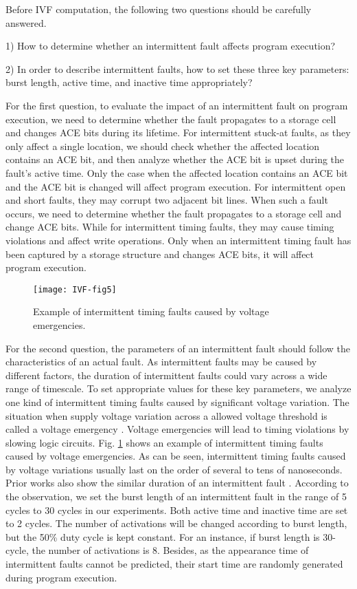 Before IVF computation, the following two questions should be carefully answered.

1) How to determine whether an intermittent fault affects program execution?

2) In order to describe intermittent faults, how to set these three key parameters: burst length, active time, and inactive time appropriately?

For the first question, to evaluate the impact of an intermittent fault on program execution, we need to determine whether the fault propagates to a storage cell and changes ACE bits during its lifetime. For intermittent stuck-at faults, as they only affect a single location, we should check whether the affected location contains an ACE bit, and then analyze whether the ACE bit is upset during the fault’s active time. Only the case when the affected location contains an ACE bit and the ACE bit is changed will affect program execution. For intermittent open and short faults, they may corrupt two adjacent bit lines. When such a fault occurs, we need to determine whether the fault propagates to a storage cell and change ACE bits. While for intermittent timing faults, they may cause timing violations and affect write operations. Only when an intermittent timing fault has been captured by a storage structure and changes ACE bits, it will affect program execution.

\begin{figure}[t]
    \centering
    \texttt{[image: IVF-fig5]}\\
    \caption{Example of intermittent timing faults caused by voltage emergencies.}
    \label{fig:timing-faults}
\end{figure}

For the second question, the parameters of an intermittent fault should follow the characteristics of an actual fault. As intermittent faults may be caused by different factors, the duration of intermittent faults could vary across a wide range of timescale. To set appropriate values for these key parameters, we analyze one kind of intermittent timing faults caused by significant voltage variation. The situation when supply voltage variation across a allowed voltage threshold is called a voltage emergency \cite{joseph2003control}. Voltage emergencies will lead to timing violations by slowing logic circuits. Fig. \ref{fig:timing-faults} shows an example of intermittent timing faults caused by voltage emergencies. As can be seen, intermittent timing faults caused by voltage variations usually last on the order of several to tens of nanoseconds. Prior works also show the similar duration of an intermittent fault \cite{smolens2007detecting} \cite{gracia2008analysis} \cite{stathis2001physical}. According to the observation, we set the burst length of an intermittent fault in the range of 5 cycles to 30 cycles in our experiments. Both active time and inactive time are set to 2 cycles. The number of activations will be changed according to burst length, but the 50\% duty cycle is kept constant. For an instance, if burst length is 30-cycle, the number of activations is 8. Besides, as the appearance time of intermittent faults cannot be predicted, their start time are randomly generated during program execution.


